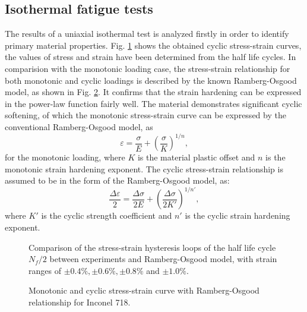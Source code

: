 \documentclass[preprint,5p,twocolumn,11pt,sort&compress]{elsarticle}
\begin{document}
\subsection{Isothermal fatigue tests}
The results of a uniaxial isothermal test is analyzed firstly in order to identify primary material properties. Fig. \ref{Fig:plot_exp_half_life_cycle} shows the obtained cyclic stress-strain curves, the values of stress and strain have been determined from the half life cycles. In comparision with the monotonic loading case, the stress-strain relationship for both monotonic and cyclic loadings is described by the known Ramberg-Osgood model, as shown in Fig. \ref{Fig:plot_monotonic_cyclic_osgood}. It confirms that the strain hardening can be expressed in the power-law function fairly well. The material demonstrates significant cyclic softening, of which the monotonic stress-strain curve can be expressed by the conventional Ramberg-Osgood model, as
\begin{equation}
{\varepsilon } = \frac{{\sigma }}{{E}} + {\left( {\frac{{\sigma }}{{K}}} \right)^{1/n}},
\end{equation}
for the monotonic loading, where $K$ is the material plastic offset and $n$ is the monotonic strain hardening exponent.
The cyclic stress-strain relationship is assumed to be in the form of the Ramberg-Osgood model, as:
\begin{equation}
\frac{{\Delta \varepsilon }}{2} = \frac{{\Delta \sigma }}{{2E}} + {\left( {\frac{{\Delta \sigma }}{{2K'}}} \right)^{1/n'}},
\end{equation}
where $K'$ is the cyclic strength coefficient and $n'$ is the cyclic strain hardening exponent.

\begin{figure}[!htp]
\caption{Comparison of the stress-strain hysteresis loops of the half life cycle $N_f/2$ between experiments and Ramberg-Osgood model, with strain ranges of $\pm0.4\%, \pm0.6\%, \pm0.8\%$ and $\pm1.0\%$.}
\label{Fig:plot_exp_half_life_cycle}
\end{figure}

\begin{figure}[!htp]
\caption{Monotonic and cyclic stress-strain curve with Ramberg-Osgood relationship for Inconel 718.}
\label{Fig:plot_monotonic_cyclic_osgood}
\end{figure}
\end{document}
